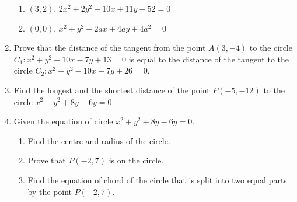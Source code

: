\documentclass{report}
\begin{document}
\begin{multicols}{2}
\begin{enumerate}
\begin{enumerate}
                        \item $(3, 2)$, $2x^2 + 2y^2 + 10x + 11y - 52 = 0$
                        \item $(0, 0)$, $x^2 + y^2 - 2ax + 4ay + 4a^2 = 0$
                  \end{enumerate}
            \item Prove that the distance of the tangent from the point $A(3, -4)$ to the circle
                  $C_1: x^2 + y^2 - 10x - 7y + 13 = 0$ is equal to the distance of the tangent to
                  the circle $C_2: x^2 + y^2 - 10x - 7y + 26 = 0$.
            \item Find the longest and the shortest distance of the point $P(-5, -12)$ to the
                  circle $x^2 + y^2 + 8y - 6y = 0$.
            \item Given the equation of circle $x^2 + y^2 + 8y - 6y = 0$.
                  \begin{enumerate}
                        \item Find the centre and radius of the circle.
                        \item Prove that $P(-2, 7)$ is on the circle.
                        \item Find the equation of chord of the circle that is split into two equal parts by
                              the point $P(-2, 7)$.
                  \end{enumerate}
      \end{enumerate}

\end{multicols}
\end{document}
